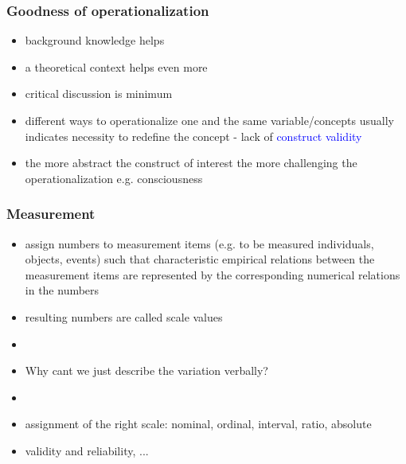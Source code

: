 \documentclass[]{beamer}
\begin{document}
\begin{frame}
\frametitle{Goodness of operationalization}
\begin{itemize}
 \item background knowledge helps
 \item a theoretical context helps even more
 \item critical discussion is minimum 
 \item different ways to operationalize one and the same variable/concepts usually indicates necessity to redefine the concept - lack of \textcolor{blue}{construct validity}
 \item the more abstract the construct of interest the more challenging the operationalization e.g. consciousness 
\end{itemize}
\end{frame}

% 


\begin{frame}
\frametitle{Measurement}

\begin{itemize}
 \item assign numbers to measurement items (e.g. to be measured
individuals, objects, events) such that characteristic empirical relations between the measurement items are represented by the corresponding numerical relations in the numbers 
\item resulting numbers are called scale values
\item[]
\item<2->[$\Rightarrow$] Why cant we just describe the variation verbally?
\item<2->[] 
\item<3-> assignment of the right scale: nominal, ordinal, interval,
ratio, absolute
\item<3-> validity and reliability, ... 
\end{itemize}
\end{frame}
\end{document}
